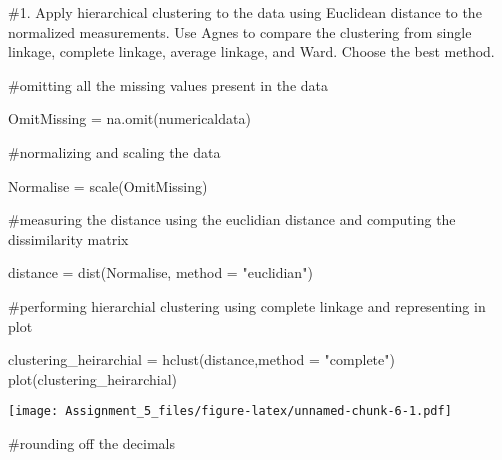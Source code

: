 \documentclass[
]{article}
\newenvironment{Shaded}{\begin{snugshade}}{\end{snugshade}}
\newcommand{\AttributeTok}[1]{\textcolor[rgb]{0.77,0.63,0.00}{#1}}
\newcommand{\DecValTok}[1]{\textcolor[rgb]{0.00,0.00,0.81}{#1}}
\newcommand{\FunctionTok}[1]{\textcolor[rgb]{0.00,0.00,0.00}{#1}}
\newcommand{\NormalTok}[1]{#1}
\newcommand{\OtherTok}[1]{\textcolor[rgb]{0.56,0.35,0.01}{#1}}
\newcommand{\SpecialCharTok}[1]{\textcolor[rgb]{0.00,0.00,0.00}{#1}}
\newcommand{\StringTok}[1]{\textcolor[rgb]{0.31,0.60,0.02}{#1}}
\begin{document}
\#1. Apply hierarchical clustering to the data using Euclidean distance
to the normalized measurements. Use Agnes to compare the clustering from
single linkage, complete linkage, average linkage, and Ward. Choose the
best method.

\#omitting all the missing values present in the data

\begin{Shaded}
\begin{Highlighting}[]
\NormalTok{OmitMissing }\OtherTok{=} \FunctionTok{na.omit}\NormalTok{(numericaldata)}
\end{Highlighting}
\end{Shaded}

\#normalizing and scaling the data

\begin{Shaded}
\begin{Highlighting}[]
\NormalTok{Normalise }\OtherTok{=} \FunctionTok{scale}\NormalTok{(OmitMissing)}
\end{Highlighting}
\end{Shaded}

\#measuring the distance using the euclidian distance and computing the
dissimilarity matrix

\begin{Shaded}
\begin{Highlighting}[]
\NormalTok{distance }\OtherTok{=} \FunctionTok{dist}\NormalTok{(Normalise, }\AttributeTok{method =} \StringTok{"euclidian"}\NormalTok{)}
\end{Highlighting}
\end{Shaded}

\#performing hierarchial clustering using complete linkage and
representing in plot

\begin{Shaded}
\begin{Highlighting}[]
\NormalTok{clustering\_heirarchial }\OtherTok{=} \FunctionTok{hclust}\NormalTok{(distance,}\AttributeTok{method =} \StringTok{"complete"}\NormalTok{)}
\FunctionTok{plot}\NormalTok{(clustering\_heirarchial)}
\end{Highlighting}
\end{Shaded}

\texttt{[image: Assignment\_5\_files/figure-latex/unnamed-chunk-6-1.pdf]}

\#rounding off the decimals

\begin{Shaded}
\end{Shaded}
\end{document}
